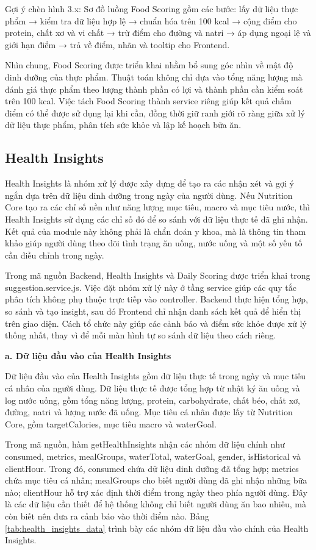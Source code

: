 \documentclass[12pt, a4paper]{report}
\begin{document}
Gợi ý chèn hình 3.x: Sơ đồ luồng Food Scoring gồm các bước: lấy dữ liệu thực phẩm → kiểm tra dữ liệu hợp lệ → chuẩn hóa trên 100 kcal → cộng điểm cho protein, chất xơ và vi chất → trừ điểm cho đường và natri → áp dụng ngoại lệ và giới hạn điểm → trả về điểm, nhãn và tooltip cho Frontend.

Nhìn chung, Food Scoring được triển khai nhằm bổ sung góc nhìn về mật độ dinh dưỡng của thực phẩm. Thuật toán không chỉ dựa vào tổng năng lượng mà đánh giá thực phẩm theo lượng thành phần có lợi và thành phần cần kiểm soát trên 100 kcal. Việc tách Food Scoring thành service riêng giúp kết quả chấm điểm có thể được sử dụng lại khi cần, đồng thời giữ ranh giới rõ ràng giữa xử lý dữ liệu thực phẩm, phân tích sức khỏe và lập kế hoạch bữa ăn.
\subsection{Health Insights}Health Insights là nhóm xử lý được xây dựng để tạo ra các nhận xét và gợi ý ngắn dựa trên dữ liệu dinh dưỡng trong ngày của người dùng. Nếu Nutrition Core tạo ra các chỉ số nền như năng lượng mục tiêu, macro và mục tiêu nước, thì Health Insights sử dụng các chỉ số đó để so sánh với dữ liệu thực tế đã ghi nhận. Kết quả của module này không phải là chẩn đoán y khoa, mà là thông tin tham khảo giúp người dùng theo dõi tình trạng ăn uống, nước uống và một số yếu tố cần điều chỉnh trong ngày.

Trong mã nguồn Backend, Health Insights và Daily Scoring được triển khai trong suggestion.service.js. Việc đặt nhóm xử lý này ở tầng service giúp các quy tắc phân tích không phụ thuộc trực tiếp vào controller. Backend thực hiện tổng hợp, so sánh và tạo insight, sau đó Frontend chỉ nhận danh sách kết quả để hiển thị trên giao diện. Cách tổ chức này giúp các cảnh báo và điểm sức khỏe được xử lý thống nhất, thay vì để mỗi màn hình tự so sánh dữ liệu theo cách riêng.

\textbf{a. Dữ liệu đầu vào của Health Insights}

Dữ liệu đầu vào của Health Insights gồm dữ liệu thực tế trong ngày và mục tiêu cá nhân của người dùng. Dữ liệu thực tế được tổng hợp từ nhật ký ăn uống và log nước uống, gồm tổng năng lượng, protein, carbohydrate, chất béo, chất xơ, đường, natri và lượng nước đã uống. Mục tiêu cá nhân được lấy từ Nutrition Core, gồm targetCalories, mục tiêu macro và waterGoal.

Trong mã nguồn, hàm getHealthInsights nhận các nhóm dữ liệu chính như consumed, metrics, mealGroups, waterTotal, waterGoal, gender, isHistorical và clientHour. Trong đó, consumed chứa dữ liệu dinh dưỡng đã tổng hợp; metrics chứa mục tiêu cá nhân; mealGroups cho biết người dùng đã ghi nhận những bữa nào; clientHour hỗ trợ xác định thời điểm trong ngày theo phía người dùng. Đây là các dữ liệu cần thiết để hệ thống không chỉ biết người dùng ăn bao nhiêu, mà còn biết nên đưa ra cảnh báo vào thời điểm nào. Bảng \ref{tab:health_insights_data} trình bày các nhóm dữ liệu đầu vào chính của Health Insights.
\end{document}
